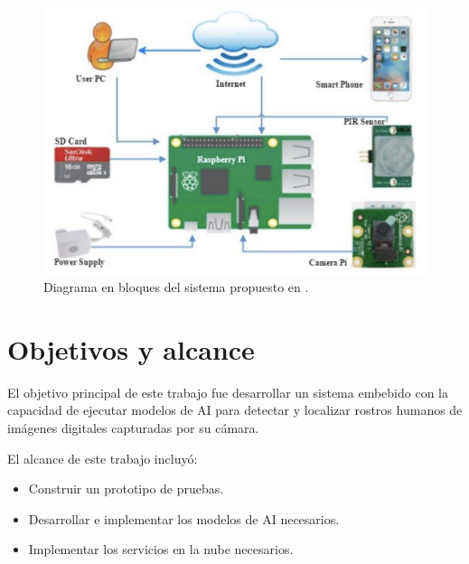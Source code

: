 \begin{figure}[h]
	\centering
	\includegraphics[scale=0.4]{./Figures/soa_arch.png}
	\caption{Diagrama en bloques del sistema propuesto en \cite{soa_ref}.}
	\label{fig:soa_arch}
\end{figure}

\section{Objetivos y alcance}
El objetivo principal de este trabajo fue desarrollar un sistema embebido con la capacidad de ejecutar modelos de AI para detectar y localizar rostros humanos de imágenes digitales capturadas por su cámara.

El alcance de este trabajo incluyó:
\begin{itemize}
	\item Construir un prototipo de pruebas.
	\item Desarrollar e implementar los modelos de AI necesarios.
	\item Implementar los servicios en la nube necesarios.
\end{itemize}
